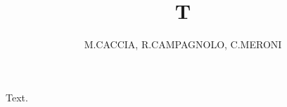 
\title{T}
\author{M.CACCIA, R.CAMPAGNOLO, C.MERONI}
\address{Dipartimento di Fisica, Milano}
\maketitle
Text.

